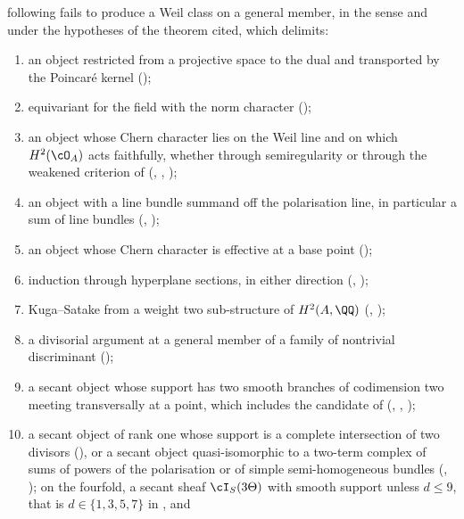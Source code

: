 \begin{theorem}[Closure]
\begin{enumerate}[label=\textup{(\roman*)},leftmargin=2.8em,itemsep=4pt]
  following fails to produce a Weil class on a general member, in the sense
  and under the hypotheses of the theorem cited, which 
  delimits:
  \begin{enumerate}[label=\textup{(\alph*)},nosep,leftmargin=2.2em]
  \item an object restricted from a projective space to the dual and
    transported by the Poincar\'e kernel (\cite[Theorem~7.3]{paperI});
  \item equivariant for the field with the norm character
    (\cite[Theorem~5.6]{paperI});
  \item an object whose Chern character lies on the Weil line and on which
    $H^{2}(\cO_{A})$ acts faithfully, whether through semiregularity or
    through the weakened criterion of \cite[Question~11.4]{Mar25b}
    (\cite[Theorem~9.7]{paperI}, \cite[Corollary~9.18]{paperI}, \cite[Theorem~9.19]{paperI});
  \item an object with a line bundle summand off the polarisation line, in
    particular a sum of line bundles (\cite[Theorem~9.20]{paperI},
    \cite[Corollary~4.21]{paperII});
  \item an object whose Chern character is effective at a base point
    (\cite[Theorem~4.5]{paperII});
  \item induction through hyperplane sections, in either direction
    (\cite[Theorem~10.3]{paperI}, \cite[Theorem~10.8]{paperI});
  \item Kuga--Satake from a weight two sub-structure of $H^{2}(A,\QQ)$
    (\cite[Proposition~11.11]{paperI}, \cite[Corollary~11.12]{paperI});
  \item a divisorial argument at a general member of a family of nontrivial
    discriminant (\cite[Proposition~15.18]{paperI});
  \item a secant object whose support has two smooth branches of codimension
    two meeting transversally at a point, which includes the candidate of
    \cite[Section~12]{Mar25b} (\cite[Theorem~4.61]{paperII},
    \cite[Corollary~4.63]{paperII}, \cite[Corollary~4.77]{paperII});
  \item a secant object of rank one whose support is a complete intersection
    of two divisors (\cite[Theorem~4.81]{paperII}), or a secant object quasi-isomorphic to
    a two-term complex of sums of powers of the polarisation or of simple
    semi-homogeneous bundles (\cite[Theorem~4.89]{paperII}, \cite[Theorem~4.92]{paperII}); on
    the fourfold, a secant sheaf $\cI_{S}(3\Theta)$ with smooth support
    unless $d\le9$, that is $d\in\{1,3,5,7\}$ in \cite[Setup~4.51]{paperII}, and

\end{enumerate}
\end{enumerate}
\end{theorem}
